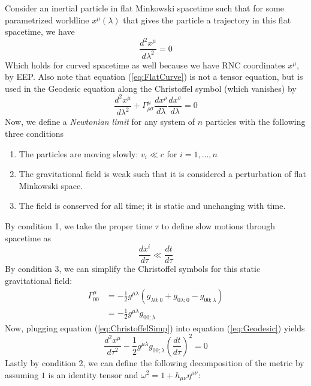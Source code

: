 \documentclass{article}
\begin{document}
	Consider an inertial particle in flat Minkowski spacetime such that for some parametrized worldline $x^\mu \left(\lambda\right)$ that gives the particle a trajectory in this flat spacetime, we have
	\begin{equation}
		\label{eq:FlatCurve}
		\frac{d^2 x^\mu}{d\lambda^2} = 0
	\end{equation}
	Which holds for curved spacetime as well because we have RNC coordinates $x^\mu$, by EEP. Also note that equation (\ref{eq:FlatCurve}) is not a tensor equation, but is used in the Geodesic equation along the Christoffel symbol (which vanishes) by
	\begin{equation}
		\label{eq:Geodesic}
		\frac{d^2 x^\mu}{d\lambda^2} + \Gamma_{\rho\sigma}^{\mu} \frac{dx^\rho }{d\lambda}\frac{d x^\sigma}{d\lambda} = 0
	\end{equation}
	Now, we define a \textit{Newtonian limit} for any system of $n$ particles with the following three conditions
	\begin{enumerate}
		\item The particles are moving slowly: $v_i \ll c$ for $i = 1, \dots, n$
		\item The gravitational field is weak such that it is considered a perturbation of flat Minkowski space.
		\item The field is conserved for all time; it is static and unchanging with time.
	\end{enumerate}
	By condition 1, we take the proper time $\tau$ to define slow motions through spacetime as
	\begin{equation}
		\label{eq:NetwonMotion}
		\frac{dx^i}{d\tau} \ll\frac{dt}{d\tau}
	\end{equation}
	By condition 3, we can simplify the Christoffel symbols for this static gravitational field:
	\begin{align}
		\nonumber
		\Gamma_{00}^\mu 	&=	
		-\frac12 g^{\mu\lambda} \left( g_{\lambda0;0} + g_{0\lambda;0} - g_{00;\lambda} \right) \\
		&= -\frac{1}{2} g^{\mu\lambda} g_{00;\lambda}
		\label{eq:ChristoffelSimp}
	\end{align}
	Now, plugging equation (\ref{eq:ChristoffelSimp}) into equation (\ref{eq:Geodesic}) yields
	\begin{equation}
		\label{eq:NewGeodesic}
		\frac{d^2 x^\mu}{d\tau^2} -\frac{1}{2} g^{\mu\lambda} g_{00;\lambda} \left( \frac{dt }{d\tau}\right)^2 = 0
	\end{equation}
	Lastly by condition 2, we can define the following decomposition of the metric by assuming $1$ is an identity tensor and $\omega^2 = 1 + h_{\mu\nu}\eta^{\mu\nu}$:
\end{document}
